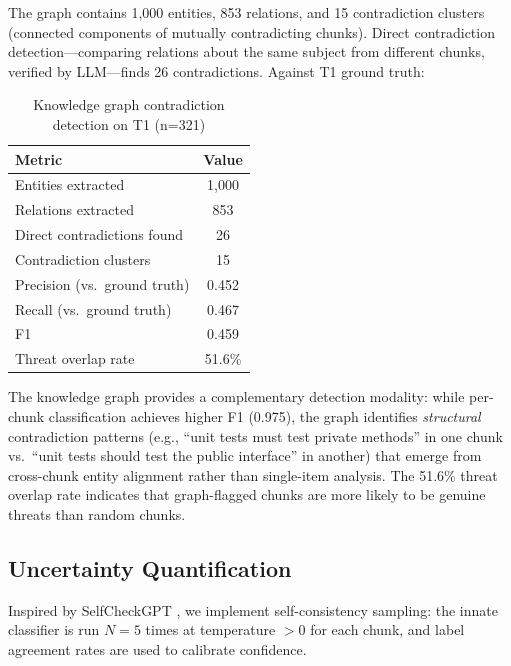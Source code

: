 \documentclass[11pt]{article}
\begin{document}
The graph contains 1{,}000 entities, 853 relations, and 15 contradiction clusters (connected components of mutually contradicting chunks). Direct contradiction detection---comparing relations about the same subject from different chunks, verified by LLM---finds 26 contradictions. Against T1 ground truth:

\begin{table}[h]
\centering
\caption{Knowledge graph contradiction detection on T1 (n=321)}
\label{tab:kg}
\begin{tabular}{lc}
\toprule
\textbf{Metric} & \textbf{Value} \\
\midrule
Entities extracted & 1{,}000 \\
Relations extracted & 853 \\
Direct contradictions found & 26 \\
Contradiction clusters & 15 \\
Precision (vs.\ ground truth) & 0.452 \\
Recall (vs.\ ground truth) & 0.467 \\
F1 & 0.459 \\
Threat overlap rate & 51.6\% \\
\bottomrule
\end{tabular}
\end{table}

The knowledge graph provides a complementary detection modality: while per-chunk classification achieves higher F1 (0.975), the graph identifies \emph{structural} contradiction patterns (e.g., ``unit tests must test private methods'' in one chunk vs.\ ``unit tests should test the public interface'' in another) that emerge from cross-chunk entity alignment rather than single-item analysis. The 51.6\% threat overlap rate indicates that graph-flagged chunks are more likely to be genuine threats than random chunks.

\subsection{Uncertainty Quantification}
\label{sec:uncertainty}

Inspired by SelfCheckGPT \citep{manakul2023selfcheckgpt}, we implement self-consistency sampling: the innate classifier is run $N=5$ times at temperature $>0$ for each chunk, and label agreement rates are used to calibrate confidence.
\end{document}

